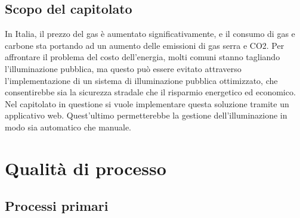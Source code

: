 \documentclass[12pt]{article}
\begin{document}
\subsection{Scopo del capitolato}
In Italia, il prezzo del gas è aumentato significativamente, e il consumo di gas e carbone sta portando ad un aumento delle emissioni di gas serra e CO2. Per affrontare il problema del costo dell'energia, molti comuni stanno tagliando l'illuminazione pubblica, ma questo può essere evitato attraverso l'implementazione di un sistema di illuminazione pubblica ottimizzato, che consentirebbe sia la sicurezza stradale che il risparmio energetico ed economico.
Nel capitolato in questione si vuole implementare questa soluzione tramite un applicativo web. Quest'ultimo permetterebbe la gestione dell'illuminazione in modo sia automatico che manuale.
\section{Qualità di processo}

\subsection{Processi primari}
\end{document}

